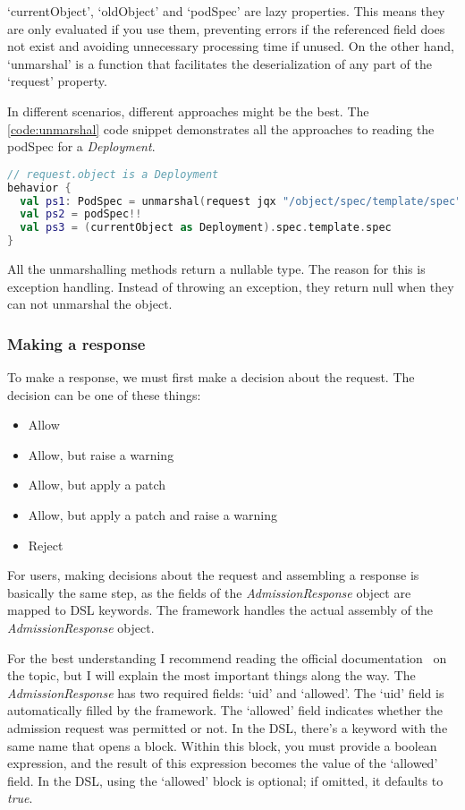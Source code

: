 `currentObject', `oldObject' and `podSpec' are lazy properties. This means they are only evaluated if you use them, preventing errors if the referenced field does not exist and avoiding unnecessary processing time if unused. On the other hand, `unmarshal' is a function that facilitates the deserialization of any part of the `request' property.

In different scenarios, different approaches might be the best. The \ref{code:unmarshal} code snippet demonstrates all the approaches to reading the podSpec for a \emph{Deployment}.

\begin{lstlisting}[caption={Unmarshalling},language=Kotlin,label=code:unmarshal]
// request.object is a Deployment
behavior {
  val ps1: PodSpec = unmarshal(request jqx "/object/spec/template/spec")!!
  val ps2 = podSpec!!
  val ps3 = (currentObject as Deployment).spec.template.spec
}
\end{lstlisting}

All the unmarshalling methods return a nullable type. The reason for this is exception handling. Instead of throwing an exception, they return null when they can not unmarshal the object.

\subsubsection{Making a response}

To make a response, we must first make a decision about the request. The decision can be one of these things:

\begin{itemize}
    \item Allow
    \item Allow, but raise a warning
    \item Allow, but apply a patch
    \item Allow, but apply a patch and raise a warning
    \item Reject
\end{itemize}

For users, making decisions about the request and assembling a response is basically the same step, as the fields of the \emph{AdmissionResponse} object are mapped to DSL keywords. The framework handles the actual assembly of the \emph{AdmissionResponse} object. 

For the best understanding I recommend reading the official documentation~\cite{AdmissionResponseDocs} on the topic, but I will explain the most important things along the way. The \emph{AdmissionResponse} has two required fields: `uid' and `allowed'. The `uid' field is automatically filled by the framework. The `allowed' field indicates whether the admission request was permitted or not. In the DSL, there's a keyword with the same name that opens a block. Within this block, you must provide a boolean expression, and the result of this expression becomes the value of the `allowed' field. In the DSL, using the `allowed' block is optional; if omitted, it defaults to \emph{true}.


